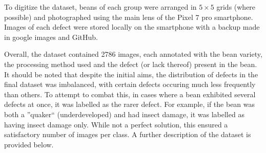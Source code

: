 To digitize the dataset, beans of each group were arranged in $5 \times 5$ grids
(where possible) and photographed using the main lens of the Pixel 7 pro smartphone.
Images of each defect were stored locally on the smartphone with a backup made
in google images and GitHub.

Overall, the dataset contained 2786 images, each annotated with the bean variety,
the processing method used and the defect (or lack thereof) present in the bean.
It should be noted that despite the initial aims, the distribution of defects in
the final dataset was imbalanced, with certain defects occuring much less
frequently than others. To attempt to combat this, in cases where a bean
exhibited several defects at once, it was labelled as the rarer defect. For
example, if the bean was both a ''quaker`` (underdeveloped) and had insect damage,
it was labelled as having insect damage only. While not a perfect solution, this
ensured a satisfactory number of images per class. A further description of the dataset
is provided below.

